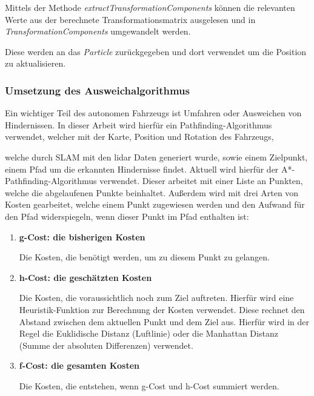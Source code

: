 Mittels der Methode \textit{extractTransformationComponents} können die relevanten Werte aus der berechnete Transformationsmatrix ausgelesen
und in \textit{TransformationComponents} umgewandelt werden.

Diese werden an das \textit{Particle} zurückgegeben und dort verwendet um die Position zu aktualisieren.

\subsubsection{Umsetzung des Ausweichalgorithmus}

Ein wichtiger Teil des autonomen Fahrzeugs ist Umfahren oder Ausweichen von Hindernissen. 
In dieser Arbeit wird hierfür ein Pathfinding-Algorithmus verwendet, welcher mit der Karte, Position und Rotation des Fahrzeugs, 

welche durch SLAM mit den \ac{lidar} Daten generiert wurde, sowie einem Zielpunkt, einem Pfad um die erkannten Hindernisse findet. 
Aktuell wird hierfür der A*-Pathfinding-Algorithmus verwendet. Dieser arbeitet mit einer Liste an Punkten, welche die abgelaufenen Punkte beinhaltet. 
Außerdem wird mit drei Arten von Kosten gearbeitet, welche einem Punkt zugewiesen werden und den Aufwand für den Pfad widerspiegeln, 
wenn dieser Punkt im Pfad enthalten ist:

\begin{enumerate}[leftmargin=*]

\item \textbf{g-Cost: die bisherigen Kosten}

Die Kosten, die benötigt werden, um zu diesem Punkt zu gelangen. 

\item \textbf{h-Cost: die geschätzten Kosten}

Die Kosten, die voraussichtlich noch zum Ziel auftreten. Hierfür wird eine Heuristik-Funktion zur Berechnung der Kosten verwendet. 
Diese rechnet den Abstand zwischen dem aktuellen Punkt und dem Ziel aus. 
Hierfür wird in der Regel die Euklidische Distanz (Luftlinie) oder die Manhattan Distanz (Summe der absoluten Differenzen) verwendet. 

\item \textbf{f-Cost: die gesamten Kosten}

Die Kosten, die entstehen, wenn g-Cost und h-Cost summiert werden. 

\end{enumerate}

